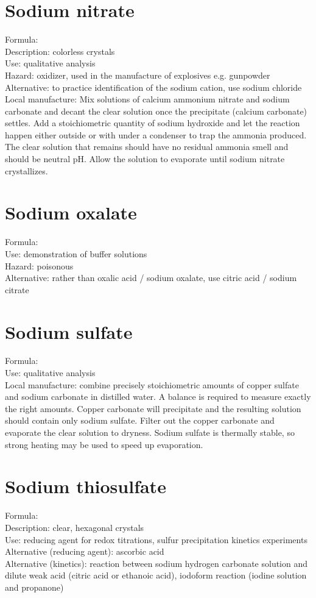 \section{Sodium nitrate}
Formula: \\
Description: colorless crystals\\
Use: qualitative analysis\\
Hazard: oxidizer, 
used in the manufacture of explosives e.g. 
gunpowder\\
Alternative: to practice identification of the sodium cation, 
use sodium chloride\\
Local manufacture: Mix solutions of calcium ammonium nitrate 
and sodium carbonate and decant the clear solution 
once the precipitate (calcium carbonate) settles. 
Add a stoichiometric quantity of sodium hydroxide 
and let the reaction happen either outside 
or with under a condenser to trap the ammonia produced. 
The clear solution that remains should have no residual ammonia smell 
and should be neutral pH. 
Allow the solution to evaporate until sodium nitrate crystallizes.

\section{Sodium oxalate}
Formula: \\
Use: demonstration of buffer solutions\\
Hazard: poisonous\\
Alternative: rather than oxalic acid / sodium oxalate, 
use citric acid / sodium citrate

\section{Sodium sulfate}
Formula: \\
Use: qualitative analysis\\
Local manufacture: combine precisely stoichiometric amounts 
of copper sulfate and sodium carbonate in distilled water. 
A balance is required to measure exactly the right amounts. 
Copper carbonate will precipitate and the resulting solution 
should contain only sodium sulfate. 
Filter out the copper carbonate and evaporate the clear solution to dryness. 
Sodium sulfate is thermally stable, 
so strong heating may be used to speed up evaporation.

\section{Sodium thiosulfate}
Formula: \\
Description: clear, 
hexagonal crystals\\
Use: reducing agent for redox titrations, 
sulfur precipitation kinetics experiments\\
Alternative (reducing agent): ascorbic acid\\
Alternative (kinetics): reaction between sodium hydrogen carbonate solution 
and dilute weak acid (citric acid or ethanoic acid), 
iodoform reaction (iodine solution and propanone)\\

